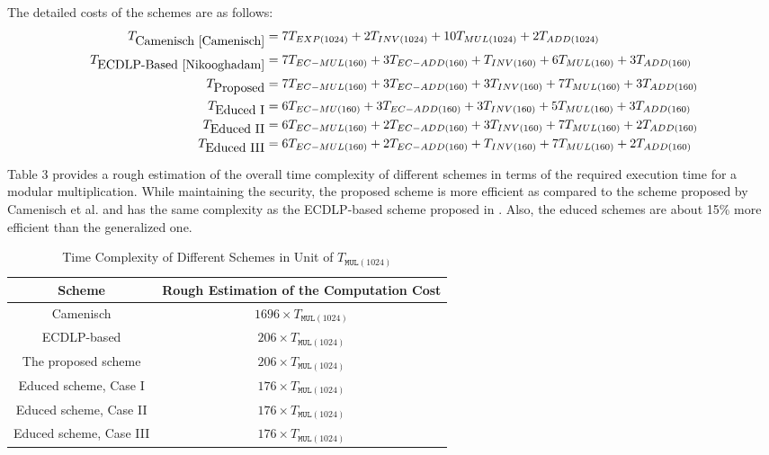 \documentclass[journal,onecolumn,draftcls]{IEEEtran}
\begin{document}
The detailed costs of the schemes are as follows:
\begin{align}
T_{\mbox{Camenisch \cite{Camenisch}}}		 &= 7T_{EXP(1024)}  +2T_{INV(1024)}  +10T_{MUL(1024)}+2 T_{ADD(1024)}				\nonumber \\
T_{\mbox{ECDLP-Based \cite{Nikooghadam}}}              &= 7T_{EC-MUL(160)}+3T_{EC-ADD(160)}+T_{INV(160)}   +6 T_{MUL(160)}+3 T_{ADD(160)}	\nonumber \\
T_{\mbox{Proposed}}							 				 &= 7T_{EC-MUL(160)}+3T_{EC-ADD(160)}+3 T_{INV(160)} +7 T_{MUL(160)}+3 T_{ADD(160)}	\nonumber \\	
T_{\mbox{Educed I}}				 							 &= 6T_{EC-MU(160)} +3T_{EC-ADD(160)}+3 T_{INV(160)} +5 T_{MUL(160)}+3 T_{ADD(160)} \nonumber \\
T_{\mbox{Educed II}}										 &= 6T_{EC-MUL(160)}+2T_{EC-ADD(160)}+3 T_{INV(160)} +7 T_{MUL(160)}+2 T_{ADD(160)}	\nonumber \\
T_{\mbox{Educed III}}			  						 &= 6T_{EC-MUL(160)}+2T_{EC-ADD(160)}+T_{INV(160)}   +7 T_{MUL(160)}+2 T_{ADD(160)}	
\end{align}

Table 3 provides a rough estimation of the overall time complexity of different schemes in terms of the required execution time for a modular multiplication. While maintaining the security, the proposed scheme is more efficient as compared to the scheme proposed by Camenisch et al. \cite{Camenisch} and has the same complexity as the ECDLP-based scheme proposed in \cite{Nikooghadam}. Also, the educed schemes are about 15\% more efficient than the generalized one.

\begin{table}[!t]
\caption{Time Complexity of Different Schemes in Unit of $T_{\texttt{MUL}(1024)}$}
\label{tb:complexity}
\centering
\begin{tabular}{|c|c|}
\hline
\bfseries \textbf{Scheme} & \textbf{Rough Estimation of the Computation Cost}\\
\hline
Camenisch \cite{Camenisch} 	& $1696\times T_{\texttt{MUL}(1024)}$\\
\hline
ECDLP-based \cite{Nikooghadam} & $206\times T_{\texttt{MUL}(1024)}$ \\
\hline
The proposed scheme & $206\times T_{\texttt{MUL}(1024)}$ \\
\hline
Educed scheme, Case I & $176\times T_{\texttt{MUL}(1024)}$ \\
\hline
Educed scheme, Case II & $176\times T_{\texttt{MUL}(1024)}$ \\
\hline
Educed scheme, Case III & $176\times T_{\texttt{MUL}(1024)}$ \\
\hline
\end{tabular}
\end{table}
\end{document}
